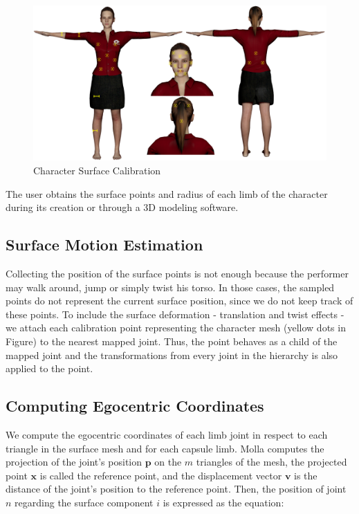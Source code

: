 \documentclass{vgtc}
\makeatletter
\def\maxwidth{\ifdim\Gin@nat@width>\linewidth\linewidth
    \else\Gin@nat@width\fi}
\let\Oldincludegraphics\includegraphics
\renewcommand{\includegraphics}[1]{\Oldincludegraphics[width=.8\maxwidth]{#1}}
\makeatother
\begin{document}
\begin{figure}
\centering
\includegraphics{../figures/TalitaPoints.png}
\caption{Character Surface Calibration}
\end{figure}

The user obtains the surface points and radius of each limb of the
character during its creation or through a 3D modeling software.

    \subsection{Surface Motion Estimation}\label{surface-motion-estimation}

Collecting the position of the surface points is not enough because the
performer may walk around, jump or simply twist his torso. In those
cases, the sampled points do not represent the current surface position,
since we do not keep track of these points. To include the surface
deformation - translation and twist effects - we attach each calibration
point representing the character mesh (yellow dots in Figure) to the
nearest mapped joint. Thus, the point behaves as a child of the mapped
joint and the transformations from every joint in the hierarchy is also
applied to the point.

    \subsection{Computing Egocentric
Coordinates}\label{computing-egocentric-coordinates}

We compute the egocentric coordinates of each limb joint in respect to
each triangle in the surface mesh and for each capsule limb. Molla
computes the projection of the joint's position \(\mathbf{p}\) on the
\(m\) triangles of the mesh, the projected point \(\mathbf{x}\) is
called the reference point, and the displacement vector \(\mathbf{v}\)
is the distance of the joint's position to the reference point. Then,
the position of joint \(n\) regarding the surface component \(i\) is
expressed as the equation:
\end{document}
